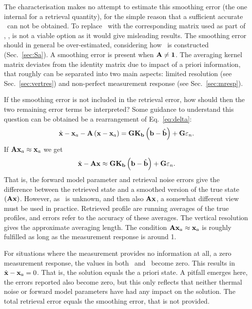 The characterisation makes no attempt to estimate this smoothing error (the one
internal for a retrieval quantity), for the simple reason that a sufficient
accurate \aCvrMtr{\SttVct}\ can not be obtained. To replace \aCvrMtr{\SttVct}\
with the corresponding matrix used as part of \OEM, , is not a
viable option as it would give misleading results. The smoothing error should
in general be over-estimated, considering how \aCvrMtr{\SttVct}\ is constructed
(Sec.~\ref{sec:Sa}). A smoothing error is present when $\mathbf{A}\neq\mathbf{1}$.
The averaging kernel matrix deviates from the identity matrix due to impact of
a priori information, that roughly can be separated into two main aspects:
limited resolution (see Sec.~\ref{sec:vertres}) and non-perfect measurement
response (see Sec.~\ref{sec:mresp}).

If the smoothing error is not included in the retrieval error, how should then
the two remaining error terms be interpreted? Some guidance to understand this
question can be obtained be a rearrangement of Eq.~\ref{eq:delta}:
\begin{equation}
  \hat{\mathbf{x}} -\mathbf{x}_{a} - \mathbf{A}\left( \mathbf{x}-\mathbf{x}_{a} \right) = 
    \mathbf{G}\mathbf{K}_{\mathbf{b}}\left(\mathbf{b}-\hat{\mathbf{b}}\right) +
    \mathbf{G}\varepsilon_n.
\end{equation}
If $\mathbf{A}\mathbf{x}_{a}\approx\mathbf{x}_{a}$ we get
\begin{equation}
  \hat{\mathbf{x}} - \mathbf{A}\mathbf{x} \approx 
    \mathbf{G}\mathbf{K}_{\mathbf{b}}\left(\mathbf{b}-\hat{\mathbf{b}}\right) +
    \mathbf{G}\varepsilon_n.
\end{equation}
That is, the forward model parameter and retrieval noise errors give the
difference between the retrieved state and a smoothed version of the true state
$(\mathbf{A}\mathbf{x})$. However, as \SttVct\ is unknown, and then also
$\mathbf{A}\mathbf{x}$, a somewhat different view must be used in practice.
Retrieved profile are running averages of the true profiles, and errors refer
to the accuracy of these averages. The vertical resolution gives the
approximate averaging length. The condition
$\mathbf{A}\mathbf{x}_{a}\approx\mathbf{x}_{a}$ is roughly fulfilled as long as the
measurement response is around 1.

For situations where the measurement provides no information at all, a zero
measurement response, the values in both \CtrFncMtr\ and \AvrKrnMtr\ become
zero. This results in $\hat{\mathbf{x}} - \mathbf{x}_{a} = 0$. That is, the solution equals
the a priori state. A pitfall emerges here, the errors reported also become
zero, but this only reflects that neither thermal noise or forward model
parameters have had any impact on the solution. The total retrieval error
equals the smoothing error, that is not provided.



